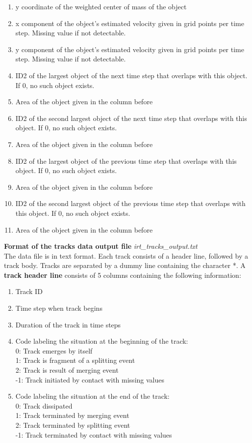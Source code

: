 \documentclass[11pt]{article}
\begin{document}
\begin{enumerate}
\item y coordinate of the weighted center of mass of the object
\item x component of the object's estimated velocity given in grid points per time step. Missing value if not detectable.
\item y component of the object's estimated velocity given in grid points per time step. Missing value if not detectable.
\item ID2 of the largest object of the next time step that overlaps with this object. If 0, no such object exists.
\item Area of the object given in the column before
\item ID2 of the second largest object of the next time step that overlaps with this object. If 0, no such object exists.
\item Area of the object given in the column before
\item ID2 of the largest object of the previous time step that overlaps with this object. If 0, no such object exists.
\item Area of the object given in the column before
\item ID2 of the second largest object of the previous time step that overlaps with this object. If 0, no such object exists.
\item Area of the object given in the column before
\end{enumerate}\vspace{0.5cm}
{\bf Format of the tracks data output file} {\it irt\_tracks\_output.txt}\\
The data file is in text format. Each track consists of a header line, followed by a track body. Tracks are separated by a dummy line containing the character *.
A {\bf track header line} consists of 5 columns containing the following information:
\begin{enumerate}
\item Track ID
\item Time step when track begins
\item Duration of the track in time steps
\item Code labeling the situation at the beginning of the track:\\
0: Track emerges by itself\\
1: Track is fragment of a splitting event\\
2: Track is result of merging event\\
-1: Track initiated by contact with missing values
\item Code labeling the situation at the end of the track:\\
0: Track dissipated\\
1: Track terminated by merging event\\
2: Track terminated by splitting event\\
-1: Track terminated by contact with missing values
\end{enumerate}
\end{document}
